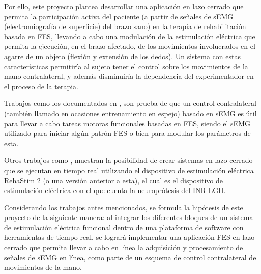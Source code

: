 Por ello, este proyecto plantea desarrollar una aplicación en lazo cerrado que permita la participación activa del paciente (a partir de señales de sEMG (electromiografía de superficie) del brazo sano) en la terapia de rehabilitación basada en FES, llevando a cabo una modulación de la estimulación eléctrica que permita la ejecución, en el brazo afectado, de los movimientos involucrados en el agarre de un objeto (flexión y extensión de los dedos). Un sistema con estas características permitiría al sujeto tener el control sobre los movimientos de la mano contralateral, y además disminuiría la dependencia del experimentador en el proceso de la terapia.

Trabajos como los documentados en \cite{Zhou2018} \cite{Kim2015} \cite{Yi2013} \cite{Fonseca2019}, son prueba de que un control contralateral (también llamado en ocasiones entrenamiento en espejo) basado en sEMG es útil para llevar a cabo tareas motoras funcionales basadas en FES, siendo el sEMG utilizado para iniciar algún patrón FES o bien para modular los parámetros de esta.

Otros trabajos como \cite{Salchow2016} \cite{Sun2014} \cite{Woods2018}, muestran la posibilidad de crear sistemas en lazo cerrado que se ejecutan en tiempo real utilizando el dispositivo de estimulación eléctrica RehaStim 2 (o una versión anterior a esta), el cual es el dispositivo de estimulación eléctrica con el que cuenta la neuroprótesis del INR-LGII.



Considerando los trabajos antes mencionados, se formula la hipótesis de este proyecto de la siguiente manera: al integrar los diferentes bloques de un sistema de estimulación eléctrica funcional dentro de una plataforma de software con herramientas de tiempo real, se logrará implementar una aplicación FES en lazo cerrado que permita llevar a cabo en línea la adquisición y procesamiento de señales de sEMG en línea, como parte de un esquema de control contralateral de movimientos de la mano.

